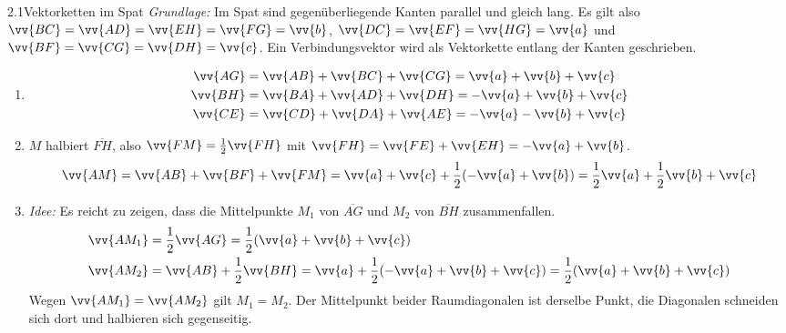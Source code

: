 

\begin{loesung}{2.1}{Vektorketten im Spat}
\textit{Grundlage:} Im Spat sind gegenüberliegende Kanten parallel und gleich lang. Es gilt also $\vv{BC}=\vv{AD}=\vv{EH}=\vv{FG}=\vv{b}$, $\vv{DC}=\vv{EF}=\vv{HG}=\vv{a}$ und $\vv{BF}=\vv{CG}=\vv{DH}=\vv{c}$. Ein Verbindungsvektor wird als Vektorkette entlang der Kanten geschrieben.
\begin{enumerate}[label=\alph*)]
  \item
  \begin{align*}
    \vv{AG} &= \vv{AB}+\vv{BC}+\vv{CG} = \vv{a}+\vv{b}+\vv{c}\\
    \vv{BH} &= \vv{BA}+\vv{AD}+\vv{DH} = -\vv{a}+\vv{b}+\vv{c}\\
    \vv{CE} &= \vv{CD}+\vv{DA}+\vv{AE} = -\vv{a}-\vv{b}+\vv{c}
  \end{align*}
  \item $M$ halbiert $\overline{FH}$, also $\vv{FM} = \frac{1}{2}\vv{FH}$ mit $\vv{FH} = \vv{FE}+\vv{EH} = -\vv{a}+\vv{b}$.
  \[\vv{AM} = \vv{AB}+\vv{BF}+\vv{FM} = \vv{a}+\vv{c}+\dfrac{1}{2}(-\vv{a}+\vv{b}) = \dfrac{1}{2}\vv{a}+\dfrac{1}{2}\vv{b}+\vv{c}\]
  \item \textit{Idee:} Es reicht zu zeigen, dass die Mittelpunkte $M_1$ von $\overline{AG}$ und $M_2$ von $\overline{BH}$ zusammenfallen.
  \begin{align*}
    \vv{AM_1} &= \dfrac{1}{2}\vv{AG} = \dfrac{1}{2}(\vv{a}+\vv{b}+\vv{c})\\
    \vv{AM_2} &= \vv{AB}+\dfrac{1}{2}\vv{BH} = \vv{a}+\dfrac{1}{2}(-\vv{a}+\vv{b}+\vv{c}) = \dfrac{1}{2}(\vv{a}+\vv{b}+\vv{c})
  \end{align*}
  Wegen $\vv{AM_1}=\vv{AM_2}$ gilt $M_1=M_2$. Der Mittelpunkt beider Raumdiagonalen ist derselbe Punkt, die Diagonalen schneiden sich dort und halbieren sich gegenseitig.
\end{enumerate}
\end{loesung}

